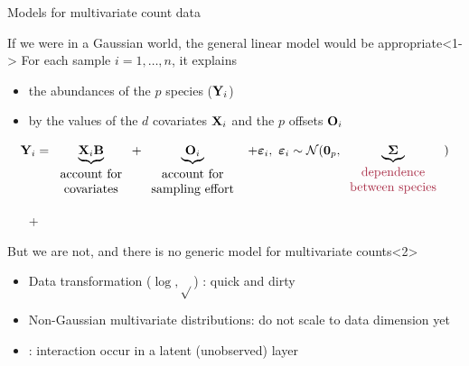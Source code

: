 \documentclass[10pt, c, xcolor=x11names]{beamer}\usepackage[]{graphicx}\usepackage[]{color}
\begin{document}
\begin{frame}{Models for multivariate count data}
\begin{small}

  \begin{block}{If we were in a Gaussian world, the \alert{general linear model} would be appropriate}<1->
    For each sample $i = 1,\dots,n$, it explains 
    \begin{itemize}
    \item the abundances of the $p$ species ($\mathbf{Y}_i$) 
    \item by the values of the $d$ covariates $\mathbf{X}_i$ and the $p$ offsets $\mathbf{O}_i$
    \end{itemize}
    \begin{equation*}
      \bY_i = 
      \underbrace{\bX_i \mathbf{B}}_{\begin{tabular}{c} \text{account for} \\ \text{covariates}  \end{tabular}} 
      + \underbrace{\bO_i}_{\begin{tabular}{c} \text{account for} \\ \text{sampling effort}  \end{tabular}}
      \ + \bvarepsilon_i, 
      \ \bvarepsilon_i \sim \mathcal{N}(\bzr_p, \underbrace{\bSigma}_{\begin{tabular}{c} \text{\emphase{dependence}} \\ \text{\emphase{between species}}  \end{tabular}})
    \end{equation*}
    \begin{itemize}
      \item[\textcolor{mred}{+}] 
    \end{itemize}
  \end{block}

  \begin{block}{But we are not, and there is no generic model for multivariate counts}<2>
    \begin{itemize}
      \item Data transformation ($\log{}, \sqrt{} $) : quick and dirty \\
      \item Non-Gaussian multivariate distributions: do not scale to data dimension yet \\
      \item {}: interaction occur in a latent (unobserved) layer\\
    \end{itemize}
  \end{block}

\end{small}
    
\end{frame}
\end{document}
